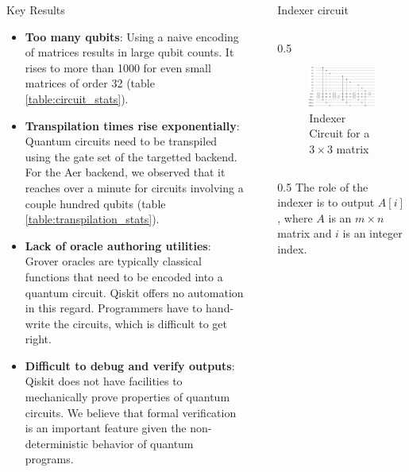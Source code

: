 \documentclass[final]{beamer}
\newlength{\sepwidth}
\newlength{\colwidth}
\newcommand{\separatorcolumn}{\begin{column}{\sepwidth}\end{column}}
\begin{document}
\begin{frame}[t]
\begin{columns}[t]
\begin{column}{\colwidth}
  \begin{alertblock}{Key Results}
    \begin{itemize}
      \item \textbf{Too many qubits}: Using a naive encoding of matrices results
        in large qubit counts. It rises to more than 1000 for even small
        matrices of order 32 (table \ref{table:circuit_stats}).
      \item \textbf{Transpilation times rise exponentially}: Quantum circuits
        need to be transpiled using the gate set of the targetted backend. For
        the Aer backend, we observed that it reaches over a minute for circuits
        involving a couple hundred qubits (table
        \ref{table:transpilation_stats}).
      \item \textbf{Lack of oracle authoring utilities}: Grover oracles are typically classical functions that need to be encoded into a quantum circuit. Qiskit offers no automation in this regard. Programmers have to hand-write the circuits, which is difficult to get right.
      \item \textbf{Difficult to debug and verify outputs}: Qiskit does not have
        facilities to mechanically prove properties of quantum circuits. We
        believe that formal verification is an important feature given the
        non-deterministic behavior of quantum programs.
    \end{itemize}
  \end{alertblock}
\end{column}

\separatorcolumn

\begin{column}{\colwidth}
  \begin{block}{Indexer circuit}
    \begin{column}{0.5\colwidth}
    \begin{figure}
      \centering
      \includegraphics[scale=0.5]{../paper/results/indexer_3x3.png} 
      \caption{Indexer Circuit for a $3 \times 3$ matrix}
      \label{fig:indexer_circuit_3x3}
    \end{figure}
    \end{column}
    \begin{column}{0.5\colwidth}
      \vfill
      The role of the indexer is to output $A[i]$, where $A$ is an $m \times n$
      matrix and $i$ is an integer index. 


\end{column}
\end{block}
\end{column}
\end{columns}
\end{frame}
\end{document}
